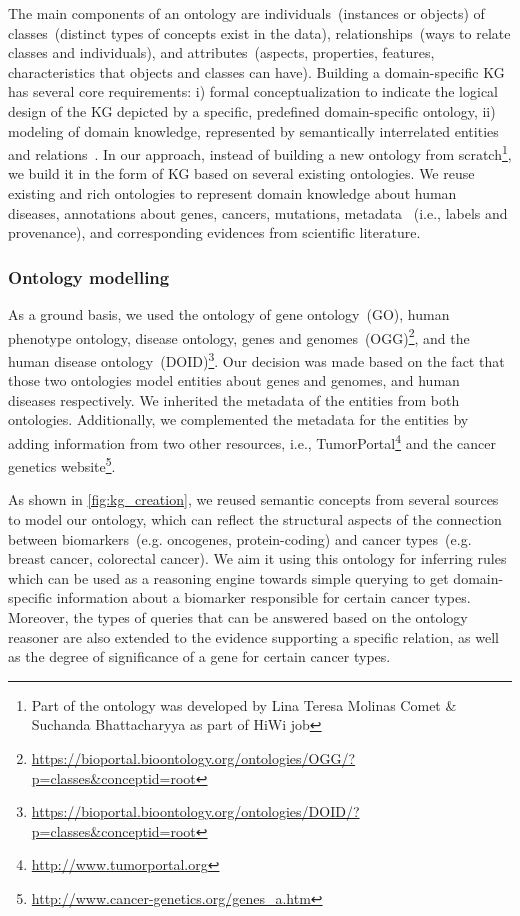 \hspace*{3.5mm} The main components of an ontology are individuals~(instances or objects) of classes~(distinct types of concepts exist in the data), relationships~(ways to relate classes and individuals), and attributes~(aspects, properties, features, characteristics that objects and classes can have). Building a domain-specific KG has several core requirements: i) formal conceptualization to indicate the logical design of the KG depicted by a specific, predefined domain-specific ontology, ii) modeling of domain knowledge, represented by semantically interrelated entities and relations~\cite{abu2020domain}. %
In our approach, instead of building a new ontology from scratch\footnote{Part of the ontology was developed by Lina Teresa Molinas Comet \& Suchanda Bhattacharyya as part of HiWi job}, we build it in the form of KG based on several existing ontologies. We reuse existing and rich ontologies to represent domain knowledge about human diseases, annotations about genes, cancers, mutations, metadata ~(i.e., labels and provenance), and corresponding evidences from scientific literature. 
\subsubsection{Ontology modelling}
As a ground basis, we used the ontology of gene ontology~(GO), human phenotype ontology, disease ontology, genes and genomes~(OGG)\footnote{\url{https://bioportal.bioontology.org/ontologies/OGG/?p=classes&conceptid=root}}, and the human disease ontology~(DOID)\footnote{\url{https://bioportal.bioontology.org/ontologies/DOID/?p=classes&conceptid=root}}. Our decision was made based on the fact that those two ontologies model entities about genes and genomes, and human diseases respectively. We inherited the metadata of the entities from both ontologies. Additionally, we complemented the metadata for the entities by adding information from two other resources, i.e., TumorPortal\footnote{\url{http://www.tumorportal.org}} and the cancer genetics website\footnote{\url{http://www.cancer-genetics.org/genes_a.htm}}. 

\hspace*{3.5mm} As shown in \cref{fig:kg_creation}, we reused semantic concepts from several sources to model our ontology, which can reflect the structural aspects of the connection between biomarkers~(e.g. oncogenes, protein-coding) and cancer types~(e.g. breast cancer, colorectal cancer). We aim it using this ontology for inferring rules which can be used as a reasoning engine towards simple querying to get domain-specific information about a biomarker responsible for certain cancer types. Moreover, the types of queries that can be answered based on the ontology reasoner are also extended to the evidence supporting a specific relation, as well as the degree of significance of a gene for certain cancer types. 

